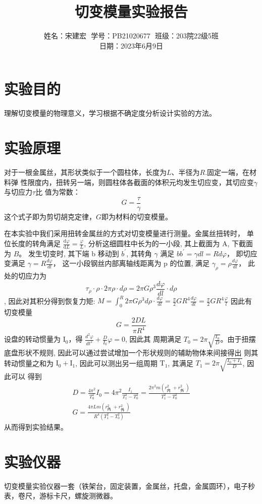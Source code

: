 \documentclass{article}
\title{切变模量实验报告}
\author{姓名：宋建宏\,\, 学号：PB21020677\,\, 班级：203院22级5班\\ 日期：2023年6月9日}
\date{}
\begin{document}
\maketitle

\section*{实验目的}
理解切变模量的物理意义，学习根据不确定度分析设计实验的方法。
\section*{实验原理}
对于一根金属丝，其形状类似于一个圆柱体，长度为$L$、半径为$ R$.固定一端，在材料弹
性限度内，扭转另一端，则圆柱体各截面的体积元均发生切应变，其切应变$\gamma$与切应力$\tau$比
值为常数：
\[G=\frac{\tau}{\gamma}\]
这个式子即为剪切胡克定律，$G$即为材料的切变模量。

在本实验中我们采用扭转金属丝的方式对切变模量进行测量。金属丝扭转时，
单位长度的转角满足 $\frac{\mathrm{d} \varphi} { \mathrm{d} L}=\frac{\varphi}{L} $, 分析这细圆柱中长为的一小段, 其上截面为 $\mathrm{A}$, 下截面 为 $B$。
发生切变时, 其下端 b 移动到 $b^{\prime}$, 其转角 $\gamma$ 满足
$b b^{\prime}=\gamma d l=R d \varphi$，
即切应变满足
$\gamma=R \frac{d \varphi}{d l}$，
这一小段钢丝内部离轴线距离为 $\mathrm{p}$ 的位置, 满足
$\gamma_\rho=\rho \frac{d \varphi}{d l}$，
此处的切应力为 $$\tau_\rho \cdot \rho \cdot 2 \pi \rho \cdot d \rho=2 \pi G \rho^3 \frac{d \varphi}{d l} \cdot d \rho$$, 因此对其积分得到恢复力矩:
$M=\int_0^R 2 \pi G \rho^3 d \rho \cdot \frac{d \varphi}{d l}=\frac{\pi}{2} G R^4 \frac{d \varphi}{d l}=\frac{\pi}{2} G R^4 \frac{\varphi}{l}$
因此有切变模量 $$G=\frac{2 D L}{\pi R^4}$$
设盘的转动惯量为 $\mathrm{I}_0$，得 $\frac{d^2 \varphi}{d t^2}+\frac{D}{I_0} \varphi=0$, 因此其
周期满足 $T_0=2 \pi \sqrt{\frac{I_0}{D}}$。由于扭摆底盘形状不规则, 因此可以通过尝试增加一个形状规则的辅助物体来间接得出 则其转动惯量之和为 $\mathrm{I}_0+\mathrm{I}_1$, 因此可以测出另一组周期 $\mathrm{T}_1$, 其满足 $T_1=2 \pi \sqrt{\frac{I_0+I_1}{D}}$, 因此可以 得到
$$
\begin{gathered}
D=\frac{4 \pi^2}{T_0^2} I_0=4 \pi^2 \frac{I_1}{T_1^2-T_0^2}=\frac{2 \pi^2 m\left(r_{\text {内 }}^2+r_{\text {外 }}^2\right)}{T_1^2-T_0^2} \\
G=\frac{4 \pi L m\left(r_{\text {內 }}^2+r_{\text {外 }}^2\right)}{R^4\left(T_1^2-T_0^2\right)}
\end{gathered}
$$
从而得到实验结果。

\section*{实验仪器}
切变模量实验仪器一套（铁架台，固定装置，金属丝，托盘，金属圆环），电子秒表，卷尺，游标卡尺，螺旋测微器。
\end{document}
